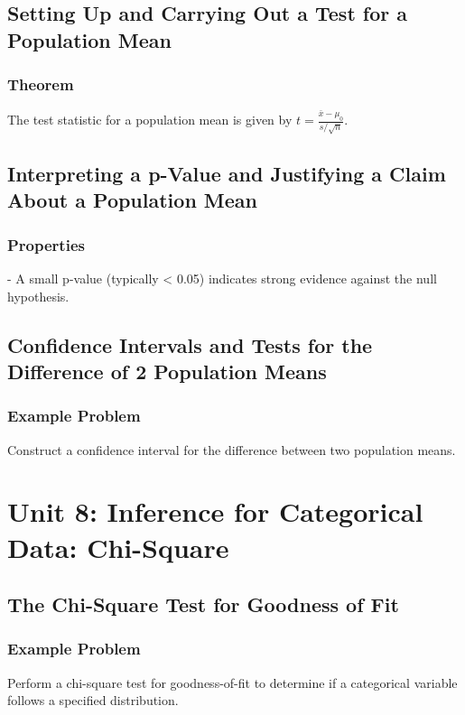 \subsection{Setting Up and Carrying Out a Test for a Population Mean}
\subsubsection{Theorem}
\begin{theorem}
The test statistic for a population mean is given by \( t = \frac{\bar{x} - \mu_0}{s/\sqrt{n}} \).
\end{theorem}

\subsection{Interpreting a p-Value and Justifying a Claim About a Population Mean}
\subsubsection{Properties}
\begin{properties}
- A small p-value (typically < 0.05) indicates strong evidence against the null hypothesis.
\end{properties}

\subsection{Confidence Intervals and Tests for the Difference of 2 Population Means}
\subsubsection{Example Problem}
\begin{example}
Construct a confidence interval for the difference between two population means.
\end{example}

\section{Unit 8: Inference for Categorical Data: Chi-Square}
\subsection{The Chi-Square Test for Goodness of Fit}
\subsubsection{Example Problem}
\begin{example}
Perform a chi-square test for goodness-of-fit to determine if a categorical variable follows a specified distribution.
\end{example}

